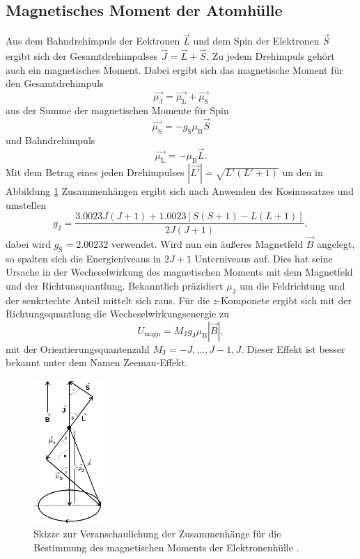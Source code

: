 \subsection{Magnetisches Moment der Atomhülle}
\label{sec:atomhülle}
Aus dem Bahndrehimpuls der Eektronen $\vec{L}$ und dem Spin der Elektronen $\vec{S}$ ergibt sich der
Gesamtdrehimpulses $\vec{J} = \vec{L} + \vec{S}$. Zu jedem Drehimpuls gehört auch ein magnetisches Moment.
Dabei ergibt sich das magnetische Moment für den Gesamtdrehimpuls 
\begin{equation*}
  \vec{\mu_\text{J}} = \vec{\mu_\text{L}} + \vec{\mu_\text{S}}
\end{equation*}
aus der Summe der magnetischen Momente für Spin 
\begin{equation}
\label{eqn:magspin}
  \vec{\mu_\text{S}} = -g_\text{S} \mu_\text{B} \vec{S}
\end{equation}
und Bahndrehimpuls
\begin{equation}
  \label{ean:magbahn}
  \vec{\mu_\text{L}} = - \mu_\text{B} \vec{L}.
\end{equation}
Mit dem Betrag eines jeden Drehimpulses $|\vec{L'}| = \sqrt{L' \left(L'+1\right)}$ un den
in Abbildung \ref{fig:magnmoment} Zusammenhängen ergibt sich nach Anwenden des Kosinussatzes
und umstellen
\begin{equation}
  \label{eqn:gj}
  g_\text{J} = \frac{\num{3.0023}J(J+1)+\num{1.0023}[S(S+1)-L(L+1)]}{2J(J+1)},
\end{equation}
dabei wird $g_\text{S} = \num{2.00232}$ verwendet.
Wird nun ein äußeres Magnetfeld $\vec{B}$ angelegt, so spalten sich die Energieniveaus in $2J+1$ Unterniveaus auf.
Dies hat seine Ursache in der Wecheselwirkung des magnetischen Moments mit dem Magnetfeld und der Richtunsquantlung.
Bekanntlich präzidiert $\mu_\text{J}$ um die Feldrichtung und der senkrtechte Anteil mittelt sich raus. Für die $z$-Komponete
ergibt sich mit der Richtungsquantlung die Wecheselwirkungsenergie zu
\begin{equation}
  \label{eqn:wwenergie}
  U_\text{magn} = M_\text{J} g_\text{J} \mu_\text{B} |\vec{B}|,
\end{equation}
mit der Orientierungsquantenzahl $M_\text{J} = -J, \ldots, J-1 ,J$. Dieser Effekt ist besser bekannt unter
dem Namen Zeeman-Effekt.
\begin{figure}
  \centering
  \includegraphics[height=5.5cm]{content/pictures/MagnMoment.png}
  \caption{Skizze zur Veranschaulichung der Zusammenhänge für die Bestimmung des magnetischen Moments der Elektronenhülle \cite{anleitung}.}
  \label{fig:magnmoment}
\end{figure}

